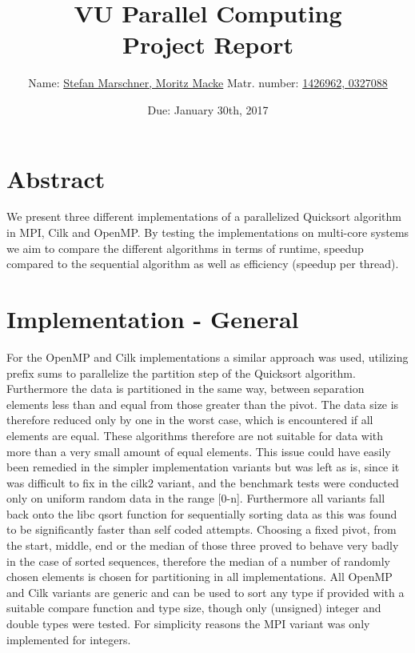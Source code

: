 \documentclass[12pt,a4paper]{article}
\title{VU Parallel Computing\\ 
\Large Project Report}
\author{Name: \underline{Stefan Marschner, Moritz Macke}\qquad
  Matr. number: \underline{1426962, 0327088}}
\date{Due: January 30th, 2017}
\begin{document}
\maketitle
\tableofcontents
\section{Abstract}

We present three different implementations of a parallelized Quicksort algorithm in MPI, Cilk and OpenMP. By testing the implementations on multi-core systems we aim to compare the different algorithms in terms of runtime, speedup compared to the sequential algorithm as well as efficiency (speedup per thread).

\section{Implementation - General}

For the OpenMP and Cilk implementations a similar approach was used, utilizing prefix sums to parallelize the partition step of the Quicksort algorithm. Furthermore the data is partitioned in the same way, between separation elements less than and equal from those greater than the pivot. The data size is therefore reduced only by one in the worst case, which is encountered if all elements are equal. These algorithms therefore are not suitable for data with more than a very small amount of equal elements. This issue could have easily been remedied in the simpler implementation variants but was left as is, since it was difficult to fix in the cilk2 variant, and the benchmark tests were conducted only on uniform random data in the range [0-n]. Furthermore all variants fall back onto the libc qsort function for sequentially sorting data as this was found to be significantly faster than self coded attempts. 
Choosing a fixed pivot, from the start, middle, end or the median of those three proved to behave very badly in the case of sorted sequences, therefore the median of a number of randomly chosen elements is chosen for partitioning in all implementations. 
All OpenMP and Cilk variants are generic and can be used to sort any type if provided with a suitable compare function and type size, though only (unsigned) integer and double types were tested. For simplicity reasons the MPI variant was only implemented for integers.
\end{document}
